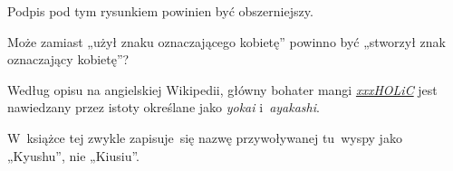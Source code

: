 \documentclass[a4paper,11pt]{article}
\numberwithin{equation}{section}
\begin{document}
\VerSpaceFour





 Podpis pod tym rysunkiem powinien być obszerniejszy.

\VerSpaceFour





 Może zamiast „użył znaku oznaczającego
kobietę” powinno być „stworzył znak oznaczający kobietę”?

\VerSpaceFour





 Według opisu na angielskiej Wikipedii, główny
bohater mangi
\href{https://en.wikipedia.org/wiki/XxxHolic}{\textit{xxxHOLiC}} jest
nawiedzany przez istoty określane jako \textit{yokai}
i~\textit{ayakashi}.

\VerSpaceFour





 W~książce tej zwykle zapisuje~się nazwę przywoływanej
tu~wyspy jako „Kyushu”, %
nie „Kiusiu”.





\end{document}
